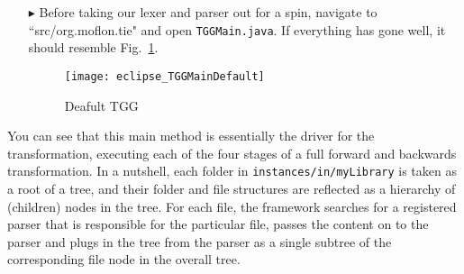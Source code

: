 \begin{itemize}


\item[$\blacktriangleright$] Before taking our lexer and parser out for a spin, navigate to ``src/org.moflon.tie" and open \texttt{TGGMain.java}. If everything
has gone well, it should resemble Fig.~\ref{eclipse:defaultTGGMain}.

\vspace{0.5cm}

\begin{figure}[!htbp]
\begin{center}
 \texttt{[image: eclipse\_TGGMainDefault]}
  \caption{Deafult TGG}
  \label{eclipse:defaultTGGMain}
\end{center}
\end{figure}

\end{itemize}

You can see that this main method is essentially the driver for the transformation, executing each of the four stages of a full forward and backwards
transformation. In a nutshell, each folder in \texttt{instances/in/myLibrary} is taken as a root of a tree, and their folder and file structures are reflected
as a hierarchy of (children) nodes in the tree. For each file, the framework searches for a registered parser that is responsible for the particular file,
passes the content on to the parser and plugs in the tree from the parser as a single subtree of the corresponding file node in the overall tree.

